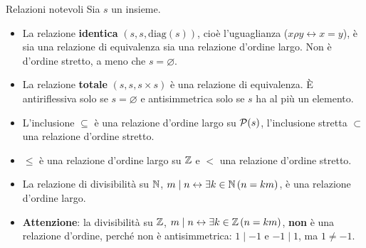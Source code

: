 
\begin{esempio}{Relazioni notevoli}
    Sia $s$ un insieme.
    \begin{itemize}
        \item La relazione \textbf{identica} $(s, s, \mathrm{diag}(s))$, cioè l'uguaglianza ($x \rho y \leftrightarrow x = y$), è sia
              una relazione di equivalenza sia una relazione d'ordine largo. Non è d'ordine stretto, a meno che $s = \varnothing$.
        \item La relazione \textbf{totale} $(s, s, s \times s)$ è una relazione di equivalenza. È antiriflessiva solo se
              $s = \varnothing$ e antisimmetrica solo se $s$ ha al più un elemento.
        \item L'inclusione $\subseteq$ è una relazione d'ordine largo su $\mathcal{P}(s)$, l'inclusione stretta $\subset$ una relazione
              d'ordine stretto.
        \item $\leq$ è una relazione d'ordine largo su $\mathbb{Z}$ e $<$ una relazione d'ordine stretto.
        \item La relazione di divisibilità su $\mathbb{N}$, $m \mid n \leftrightarrow \exists k \in \mathbb{N}\,(n = km)$, è una relazione
              d'ordine largo.
        \item \textbf{Attenzione}: la divisibilità su $\mathbb{Z}$, $m \mid n \leftrightarrow \exists k \in \mathbb{Z}\,(n = km)$,
              \textbf{non} è una relazione d'ordine, perché non è antisimmetrica: $1 \mid -1$ e $-1 \mid 1$, ma $1 \neq -1$.
    \end{itemize}
\end{esempio}

